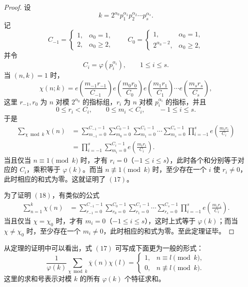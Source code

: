 \begin{proof}
	设
	\[
		k=2^{\alpha_0}p_1^{\alpha_1}p_2^{\alpha_2}\cdots p_s^{\alpha_s}.
	\]
	记
	\begin{equation}
		C_{-1}=
		\begin{cases}
			1, & \alpha_0=1,\\
			2, & \alpha_0\geq2,
		\end{cases}
		\qquad
		C_0=
		\begin{cases}
			1, & \alpha_0=1,\\
			2^{\alpha_0-2}, & \alpha_0\geq2,
		\end{cases}
		\tag{19}
	\end{equation}
	并令
	\[
		C_i=\varphi(p_i^{\alpha_i}),\qquad 1\leq i\leq s.
	\]
	当 $(n,k)=1$ 时，
	\begin{equation}
		\chi(n;k)=
		e\left(\frac{m_{-1}r_{-1}}{C_{-1}}\right)
		e\left(\frac{m_0r_0}{C_0}\right)
		e\left(\frac{m_1r_1}{C_1}\right)\cdots
		e\left(\frac{m_sr_s}{C_s}\right),
		\tag{20}
	\end{equation}
	这里 $r_{-1},r_0$ 为 $n$ 对模 $2^{\alpha_0}$ 的指标组，$r_i$ 为 $n$ 对模 $p_i^{\alpha_i}$ 的指标，并且
	\[
		0\leq r_i<C_i,\qquad 0\leq m_i<C_i,\qquad -1\leq i\leq s.
	\]
	于是
	\[
	\begin{aligned}
		\sum_{\chi\bmod k}\chi(n)
		&=
		\sum_{m_{-1}=0}^{C_{-1}-1}
		\sum_{m_0=0}^{C_0-1}
		\sum_{m_1=0}^{C_1-1}
		\cdots
		\sum_{m_s=0}^{C_s-1}
		\prod_{i=-1}^{s}e\left(\frac{m_ir_i}{C_i}\right)  \\
		&=
		\prod_{i=-1}^{s}
		\sum_{m_i=0}^{C_i-1}
		e\left(\frac{m_ir_i}{C_i}\right).
	\end{aligned}
	\]
	当且仅当 $n\equiv1\pmod k$ 时，才有 $r_i=0$（$-1\leq i\leq s$），此时各个和分别等于对应的 $C_i$，乘积等于 $\varphi(k)$。而当 $n\not\equiv1\pmod k$ 时，至少存在一个 $i$ 使 $r_i\neq0$，此时相应的和式为零。这就证明了 \((17)\)。

	为了证明 \((18)\)，有类似的公式
	\[
	\begin{aligned}
		\sum_{n=1}^{k}\chi(n)
		&=
		\sum_{r_{-1}=0}^{C_{-1}-1}
		\sum_{r_0=0}^{C_0-1}
		\sum_{r_1=0}^{C_1-1}
		\cdots
		\sum_{r_s=0}^{C_s-1}
		\prod_{i=-1}^{s}e\left(\frac{m_ir_i}{C_i}\right).
	\end{aligned}
	\]
	当且仅当 $\chi=\chi_0$ 时，才有 $m_i=0$（$-1\leq i\leq s$），这时上式等于 $\varphi(k)$；而当 $\chi\neq\chi_0$ 时，至少存在一个 $m_i\neq0$，此时相应的和式为零。至此定理证毕。
\end{proof}

从定理的证明中可以看出，式 \((17)\) 可写成下面更为一般的形式：
\begin{equation}
	\frac{1}{\varphi(k)}
	\sum_{\chi\bmod k}\overline{\chi}(n)\chi(l)
	=
	\begin{cases}
		1, & n\equiv l\pmod k,\\
		0, & n\not\equiv l\pmod k.
	\end{cases}
	\tag{17'}
\end{equation}
这里的求和号表示对模 $k$ 的所有 $\varphi(k)$ 个特征求和。

